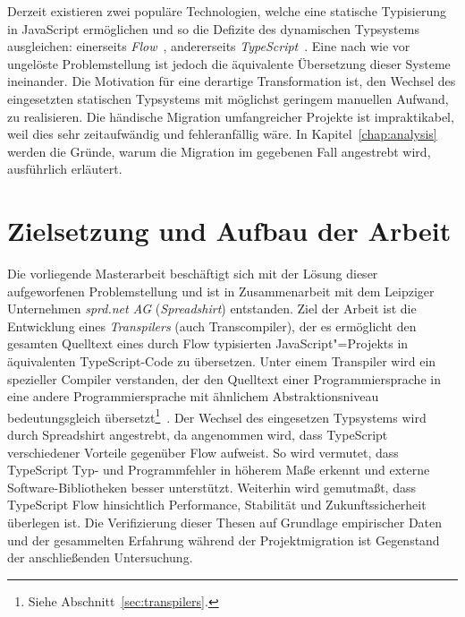 Derzeit existieren zwei populäre Technologien, welche eine statische Typisierung in JavaScript ermöglichen und so die Defizite des dynamischen Typsystems ausgleichen: einerseits \textit{Flow}~\autocite{FLOW:PAPER}, andererseits \textit{TypeScript}~\autocite{TYPESCRIPT:SPEC}. Eine nach wie vor ungelöste Problemstellung ist jedoch die äquivalente Übersetzung dieser Systeme ineinander. Die Motivation für eine derartige Transformation ist, den Wechsel des eingesetzten statischen Typsystems mit möglichst geringem manuellen Aufwand, zu realisieren. Die händische Migration umfangreicher Projekte ist impraktikabel, weil dies sehr zeitaufwändig und fehleranfällig wäre. In Kapitel~\ref{chap:analysis} werden die Gründe, warum die Migration im gegebenen Fall angestrebt wird, ausführlich erläutert.

\section{Zielsetzung und Aufbau der Arbeit}

Die vorliegende Masterarbeit beschäftigt sich mit der Lösung dieser aufgeworfenen Problemstellung und ist in Zusammenarbeit mit dem Leipziger Unternehmen \textit{sprd.net AG} (\textit{Spreadshirt}) entstanden. Ziel der Arbeit ist die Entwicklung eines \emph{Transpilers} (auch Transcompiler), der es ermöglicht den gesamten Quelltext eines durch Flow typisierten JavaScript"=Projekts in äquivalenten TypeScript-Code zu übersetzen. Unter einem Transpiler wird ein spezieller Compiler verstanden, der den Quelltext einer Programmiersprache in eine andere Programmiersprache mit ähnlichem Abstraktionsniveau bedeutungsgleich übersetzt\footnote{Siehe Abschnitt~\ref{sec:transpilers}.}~\autocite{EVGENIY:2016}. Der Wechsel des eingesetzen Typsystems wird durch Spreadshirt angestrebt, da angenommen wird, dass TypeScript verschiedener Vorteile gegenüber Flow aufweist. So wird vermutet, dass TypeScript Typ- und Programmfehler in höherem Maße erkennt und externe Software-Bibliotheken besser unterstützt. Weiterhin wird gemutmaßt, dass TypeScript Flow hinsichtlich Performance, Stabilität und Zukunftssicherheit überlegen ist. Die Verifizierung dieser Thesen auf Grundlage empirischer Daten und der gesammelten Erfahrung während der Projektmigration ist Gegenstand der anschließenden Untersuchung.

